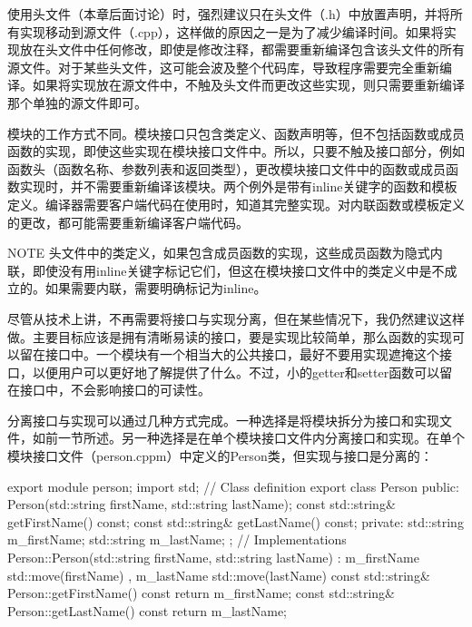 
使用头文件（本章后面讨论）时，强烈建议只在头文件（.h）中放置声明，并将所有实现移动到源文件（.cpp），这样做的原因之一是为了减少编译时间。如果将实现放在头文件中任何修改，即使是修改注释，都需要重新编译包含该头文件的所有源文件。对于某些头文件，这可能会波及整个代码库，导致程序需要完全重新编译。如果将实现放在源文件中，不触及头文件而更改这些实现，则只需要重新编译那个单独的源文件即可。

模块的工作方式不同。模块接口只包含类定义、函数声明等，但不包括函数或成员函数的实现，即使这些实现在模块接口文件中。所以，只要不触及接口部分，例如函数头（函数名称、参数列表和返回类型），更改模块接口文件中的函数或成员函数实现时，并不需要重新编译该模块。两个例外是带有inline关键字的函数和模板定义。编译器需要客户端代码在使用时，知道其完整实现。对内联函数或模板定义的更改，都可能需要重新编译客户端代码。

\begin{myNotic}{NOTE}
头文件中的类定义，如果包含成员函数的实现，这些成员函数为隐式内联，即使没有用inline关键字标记它们，但这在模块接口文件中的类定义中是不成立的。如果需要内联，需要明确标记为inline。
\end{myNotic}

尽管从技术上讲，不再需要将接口与实现分离，但在某些情况下，我仍然建议这样做。主要目标应该是拥有清晰易读的接口，要是实现比较简单，那么函数的实现可以留在接口中。一个模块有一个相当大的公共接口，最好不要用实现遮掩这个接口，以便用户可以更好地了解提供了什么。不过，小的getter和setter函数可以留在接口中，不会影响接口的可读性。

分离接口与实现可以通过几种方式完成。一种选择是将模块拆分为接口和实现文件，如前一节所述。另一种选择是在单个模块接口文件内分离接口和实现。在单个模块接口文件（person.cppm）中定义的Person类，但实现与接口是分离的：

\begin{cpp}
export module person;
import std;
// Class definition
export class Person
{
    public:
        Person(std::string firstName, std::string lastName);
        const std::string& getFirstName() const;
        const std::string& getLastName() const;
    private:
        std::string m_firstName;
        std::string m_lastName;
};
// Implementations
Person::Person(std::string firstName, std::string lastName)
    : m_firstName { std::move(firstName) }, m_lastName { std::move(lastName) } { }
const std::string& Person::getFirstName() const { return m_firstName; }
const std::string& Person::getLastName() const { return m_lastName; }
\end{cpp}


